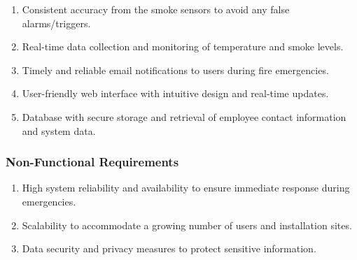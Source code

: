 \begin{enumerate}
    \item Consistent accuracy from the smoke sensors to avoid any false alarms/triggers.

    \item Real-time data collection and monitoring of temperature and smoke levels.

    \item Timely and reliable email notifications to users during fire emergencies.

    \item User-friendly web interface with intuitive design and real-time updates.

    \item Database with secure storage and retrieval of employee contact information and system data.
\end{enumerate}

\subsubsection{Non-Functional Requirements}

\begin{enumerate}
    \item High system reliability and availability to ensure immediate response during emergencies.

    \item Scalability to accommodate a growing number of users and installation sites.

    \item Data security and privacy measures to protect sensitive information.
\end{enumerate}
